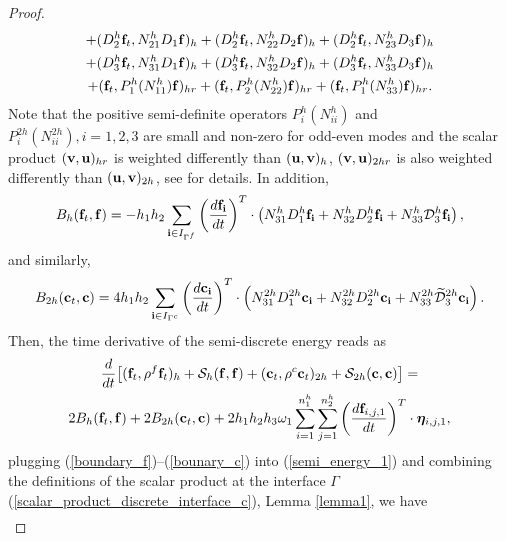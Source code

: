 \begin{proof}
\begin{multline*}
+  ({D}_2^{h}{\bf f}_t,{N}_{21}^{h}{D}_1{\bf f})_{h} 
+  ({D}_2^{h}{\bf f}_t,{N}_{22}^{h}{D}_2{\bf f})_{h} +  ({D}_2^{h}{\bf f}_t,{N}_{23}^{h}{D}_3{\bf f})_{h} \\
+  ({D}_3^{h}{\bf f}_t,{N}_{31}^{h}{D}_1{\bf f})_{h} 
+  ({D}_3^{h}{\bf f}_t,{N}_{32}^{h}{D}_2{\bf f})_{h} +  ({D}_3^{h}{\bf f}_t,{N}_{33}^{h}{D}_3{\bf f})_{h}\\
+ ({\bf f}_t, P^{h}_1(N_{11}^h){\bf f})_{hr} + ({\bf f}_t, P^{h}_2(N_{22}^h){\bf f})_{hr} + ({\bf f}_t, P^{h}_1(N_{33}^h){\bf f})_{hr}.
\end{multline*}
Note that the positive semi-definite operators $P_i^{h}(N_{ii}^{h})$ and $P_i^{2h}(N_{ii}^{2h}), i = 1,2,3$ are small and non-zero for odd-even modes and the scalar product $({\bf v}, {\bf u})_{hr}$ is weighted differently than $({\bf u}, {\bf v})_h$, $({\bf v}, {\bf u})_{2hr}$ is also weighted differently than $({\bf u}, {\bf v})_{2h}$, see \cite{sjogreen2012fourth, petersson2015wave} for details. In addition,
\begin{equation}\label{boundary_f}
B_h ({\bf f}_t,{\bf f}) = -h_1h_2\sum_{{\bf i}\in I_{\Gamma^f}}\left(\frac{d{\bf f}_{\bf i}}{dt}\right)^T\cdot\left({N}_{31}^h{D}_1^h {\bf f}_{\bf i}+ {N}_{32}^h{D}_2^h{\bf f}_{\bf i}+{N}_{33}^h\mathcal{D}_3^h{\bf f}_{\bf i}\right),
\end{equation}
and similarly, 
\begin{equation}\label{bounary_c}
B_{2h} ({\bf c}_t,{\bf c}) = 4h_1h_2\sum_{{\bf i}\in I_{\Gamma^c}}\left(\frac{d{\bf c}_{\bf i}}{dt}\right)^T\cdot\left({N}_{31}^{2h}{D}_1^{2h}{\bf c}_{\bf i}+{N}_{32}^{2h}{D}_2^{2h}{\bf c}_{\bf i}+{N}_{33}^{2h}\wt{\mathcal{D}}_3^{2h}{\bf c}_{\bf i}\right).
\end{equation}
Then, the time derivative of the semi-discrete energy reads as
\begin{multline}\label{semi_energy_1}
\frac{d}{dt}\big[({\bf f}_t,\rho^f {\bf f}_t)_h + \mathcal{S}_{h}({\bf f},{\bf f}) + ({\bf c}_t,\rho^{c} {\bf c}_t)_{2h} + \mathcal{S}_{2h}({\bf c},{\bf c}) \big]  = \\
2B_{h}({\bf f}_t,{\bf f}) + 2B_{2h}({\bf c}_t,{\bf c}) + 2h_1h_2h_3\omega_1\sum_{i = 1}^{n_1^h}\sum_{j=1}^{n_2^h}\left(\frac{d{\bf f}_{i,j,1}}{dt}\right)^T\cdot{\bm \eta}_{i,j,1},
\end{multline}
plugging (\ref{boundary_f})--(\ref{bounary_c}) into (\ref{semi_energy_1}) and combining the definitions of the scalar product at the interface $\Gamma$ (\ref{scalar_product_discrete_interface_c}), Lemma \ref{lemma1}, we have
\begin{align*}\label{semi_energy_2}

\end{align*}
\end{proof}
